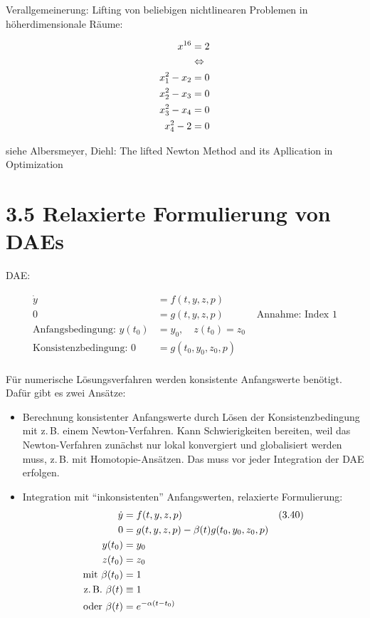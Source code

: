 Verallgemeinerung: Lifting von beliebigen nichtlinearen Problemen in höherdimensionale Räume:

\begin{align*}
x^{16} &= 2 \\
&\Leftrightarrow \\
x_1^2 - x_2 &= 0 \\
x_2^2 - x_3 &= 0 \\
x_3^2 - x_4 &= 0 \\
x_4^2 -  2  &= 0 \\
\end{align*}

siehe Albersmeyer, Diehl: The lifted Newton Method and its Apllication in Optimization

\section*{3.5 Relaxierte Formulierung von DAEs}

DAE:

\begin{align*}
\dot y &= f(t,y,z,p) \\
0 &= g(t,y,z,p) & \text{ Annahme: Index 1}\\
\text{Anfangsbedingung: } y(t_0) &= y_0, \quad z(t_0) = z_0\\
\text{Konsistenzbedingung: } 0 &= g(t_0, y_0, z_0, p) \\
\end{align*}

Für numerische Lösungsverfahren werden konsistente Anfangswerte benötigt. Dafür gibt es zwei Ansätze:

\begin{itemize}
\item Berechnung konsistenter Anfangswerte durch Lösen der Konsistenzbedingung mit z.\,B. einem Newton-Verfahren. Kann Schwierigkeiten bereiten, weil das Newton-Verfahren zunächst nur lokal konvergiert und globalisiert werden muss, z.\,B. mit Homotopie-Ansätzen. Das muss vor jeder Integration der DAE erfolgen.
\item Integration mit "`inkonsistenten"' Anfangswerten, relaxierte Formulierung:
\begin{align*}
\dot y &= f(t,y,z,p) & (3.40) \\
0 &= g(t,y,z,p) - \beta(t) g(t_0,y_0,z_0,p) \\
y(t_0) &= y_0 \\
z(t_0) &= z_0 \\
\text{mit } \beta(t_0) &= 1 \\
\text{z.\,B. } \beta(t) &\equiv 1 \\
\text{oder } \beta(t) &= e^{-\alpha(t-t_0)} \\
\end{align*}
\end{itemize}

